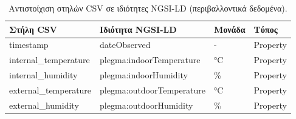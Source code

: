 \begin{table}[H]
\centering
\caption{Αντιστοίχιση στηλών \textlatin{CSV} σε ιδιότητες \textlatin{NGSI-LD} (περιβαλλοντικά δεδομένα).}
\label{tab:env-mapping}
\begin{tabular}{|>{\centering\arraybackslash}m{4cm}|>{\centering\arraybackslash}m{5cm}|>{\centering\arraybackslash}m{2cm}|>{\centering\arraybackslash}m{2cm}|}
\hline
\textbf{Στήλη \textlatin{CSV}} & \textbf{Ιδιότητα \textlatin{NGSI-LD}} & \textbf{Μονάδα} & \textbf{Τύπος} \\
\hline
\textlatin{timestamp} & \textlatin{dateObserved} & - & \textlatin{Property} \\
\hline
\textlatin{internal\_temperature} & \textlatin{plegma:indoorTemperature} & °\textlatin{C} & \textlatin{Property} \\
\hline
\textlatin{internal\_humidity} & \textlatin{plegma:indoorHumidity} & \% & \textlatin{Property} \\
\hline
\textlatin{external\_temperature} & \textlatin{plegma:outdoorTemperature} & °\textlatin{C} & \textlatin{Property} \\
\hline
\textlatin{external\_humidity} & \textlatin{plegma:outdoorHumidity} & \% & \textlatin{Property} \\
\hline
\end{tabular}
\end{table}